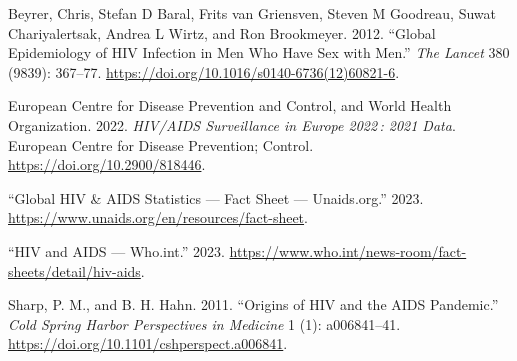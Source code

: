 \documentclass[
  12pt,
  letterpaper,
  DIV=11,
  numbers=noendperiod]{scrartcl}
\newlength{\cslhangindent}
\newlength{\cslentryspacingunit} %
\newenvironment{CSLReferences}[2] %
 {%
  \setlength{\parindent}{0pt}
  \ifodd #1
  \let\oldpar\par
  \def\par{\hangindent=\cslhangindent\oldpar}
  \fi
  \setlength{\parskip}{#2\cslentryspacingunit}
 }%
 {}
\begin{document}
\hypertarget{refs}{}
\begin{CSLReferences}{1}{0}
\leavevmode{}%
Beyrer, Chris, Stefan D Baral, Frits van Griensven, Steven M Goodreau,
Suwat Chariyalertsak, Andrea L Wirtz, and Ron Brookmeyer. 2012.
{``Global Epidemiology of {HIV} Infection in Men Who Have Sex with
Men.''} \emph{The Lancet} 380 (9839): 367--77.
\url{https://doi.org/10.1016/s0140-6736(12)60821-6}.

\leavevmode{}%
European Centre for Disease Prevention and Control, and World Health
Organization. 2022. \emph{HIV/AIDS Surveillance in Europe 2022\,: 2021
Data}. European Centre for Disease Prevention; Control.
\url{https://doi.org/10.2900/818446}.

\leavevmode{}%
{``{G}lobal {H}{I}{V} \& {A}{I}{D}{S} Statistics --- {F}act Sheet ---
Unaids.org.''} 2023.
\url{https://www.unaids.org/en/resources/fact-sheet}.

\leavevmode{}%
{``{H}{I}{V} and {A}{I}{D}{S} --- Who.int.''} 2023.
\url{https://www.who.int/news-room/fact-sheets/detail/hiv-aids}.

\leavevmode{}%
Sharp, P. M., and B. H. Hahn. 2011. {``Origins of {HIV} and the {AIDS}
Pandemic.''} \emph{Cold Spring Harbor Perspectives in Medicine} 1 (1):
a006841--41. \url{https://doi.org/10.1101/cshperspect.a006841}.

\end{CSLReferences}
\end{document}
